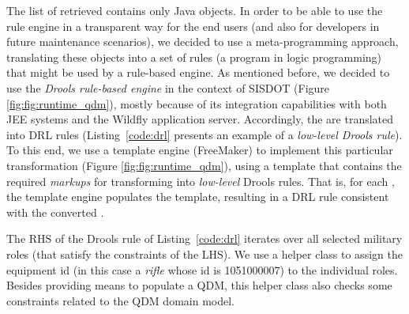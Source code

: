 


The list of retrieved \callers contains only Java objects. 
In order to be able to use the rule engine in a transparent way for the end users 
(and also for developers in future maintenance scenarios), we decided to use a 
meta-programming approach, translating these objects into a set of rules (a program in 
logic programming) that might be used by a rule-based engine. As mentioned before,  
we decided to use the \emph{Drools rule-based engine} in the context of 
SISDOT (Figure \ref{fig:fig:runtime_qdm}), mostly because of its integration capabilities 
with both JEE systems and the Wildfly application server. Accordingly,  
the \callers are translated into DRL rules (Listing~\ref{code:drl} presents an
example of a \emph{low-level Drools rule}). To this end, we use a template engine (FreeMaker) 
to implement this particular transformation (Figure \ref{fig:fig:runtime_qdm}), using a template 
that contains the required \emph{markups} for transforming \shc into \emph{low-level} Drools 
rules. That is, for each \shc, the template engine populates the template, 
resulting in a DRL rule consistent with the converted \shc.

The RHS of the Drools rule of Listing~\ref{code:drl}
iterates over all selected military roles (that satisfy
the constraints of the LHS). We use a helper class to
assign the equipment id (in this case a \emph{rifle} whose id is
1051000007) to the individual roles. Besides providing
means to populate a QDM, this helper class also checks
some constraints related to the QDM domain model. 


